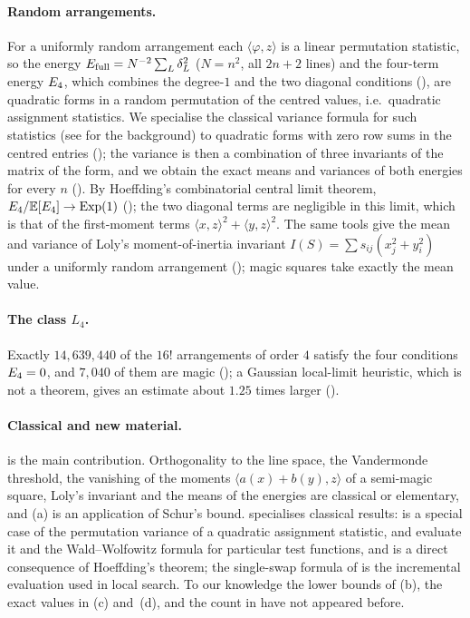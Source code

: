 \paragraph{Random arrangements.}
For a uniformly random arrangement each $\langle\varphi,z\rangle$ is a linear permutation statistic, so the energy $E_{\mathrm{full}}=N^{-2}\sum_L\delta_L^2$ ($N=n^2$, all $2n+2$ lines) and the four-term energy $E_4$, which combines the degree-$1$ and the two diagonal conditions (), are quadratic forms in a random permutation of the centred values, i.e.\ quadratic assignment statistics.
We specialise the classical variance formula for such statistics \cite{mantel1967,hubert1987assignment} (see  for the background) to quadratic forms with zero row sums in the centred entries (); the variance is then a combination of three invariants of the matrix of the form, and we obtain the exact means and variances of both energies for every $n$ ().
By Hoeffding's combinatorial central limit theorem, $E_4/\mathbb{E}[E_4]\to\mathrm{Exp}(1)$ (); the two diagonal terms are negligible in this limit, which is that of the first-moment terms $\langle x,z\rangle^2+\langle y,z\rangle^2$.
The same tools give the mean and variance of Loly's moment-of-inertia invariant $I(S)=\sum s_{ij}(x_j^2+y_i^2)$ under a uniformly random arrangement (); magic squares take exactly the mean value.

\paragraph{The class $L_4$.}
Exactly $14{,}639{,}440$ of the $16!$ arrangements of order $4$ satisfy the four conditions $E_4=0$, and $7{,}040$ of them are magic (); a Gaussian local-limit heuristic, which is not a theorem, gives an estimate about $1.25$ times larger ().

\paragraph{Classical and new material.}
 is the main contribution.
Orthogonality to the line space, the Vandermonde threshold, the vanishing of the moments $\langle a(x)+b(y),z\rangle$ of a semi-magic square, Loly's invariant \cite{loly2004invariance} and the means of the energies are classical or elementary, and (a) is an application of Schur's bound.
 specialises classical results:  is a special case of the permutation variance of a quadratic assignment statistic,  and  evaluate it and the Wald--Wolfowitz formula for particular test functions, and  is a direct consequence of Hoeffding's theorem; the single-swap formula of  is the incremental evaluation used in local search.
To our knowledge the lower bounds of (b), the exact values in (c) and~(d), and the count in  have not appeared before.

